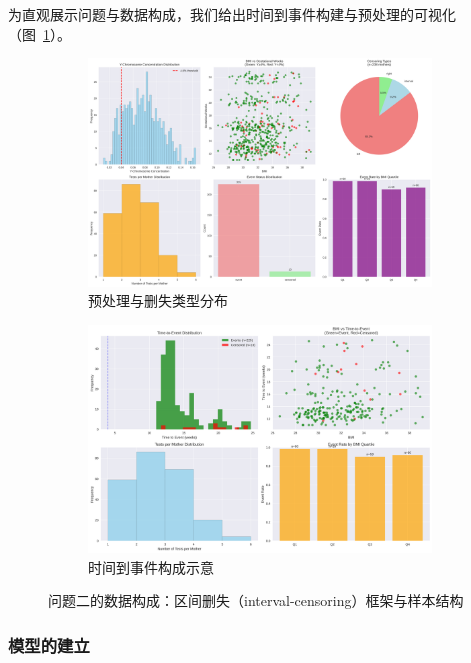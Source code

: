 \documentclass[withoutpreface]{cumcmthesis}
\begin{document}
为直观展示问题与数据构成，我们给出时间到事件构建与预处理的可视化（图~\ref{fig:p2_preprocess_time}）。

\begin{figure}[htbp]
\centering
\begin{subfigure}{0.48\textwidth}
  \centering
  \includegraphics[width=\linewidth]{output/figures/p2_preprocessing_analysis.png}
  \caption{预处理与删失类型分布}
\end{subfigure}\hfill
\begin{subfigure}{0.48\textwidth}
  \centering
  \includegraphics[width=\linewidth]{output/figures/p2_time_to_event_analysis.png}
  \caption{时间到事件构成示意}
\end{subfigure}
\caption{问题二的数据构成：区间删失（interval-censoring）框架与样本结构}
\label{fig:p2_preprocess_time}
\end{figure}
\subsubsection{模型的建立}
\end{document}
